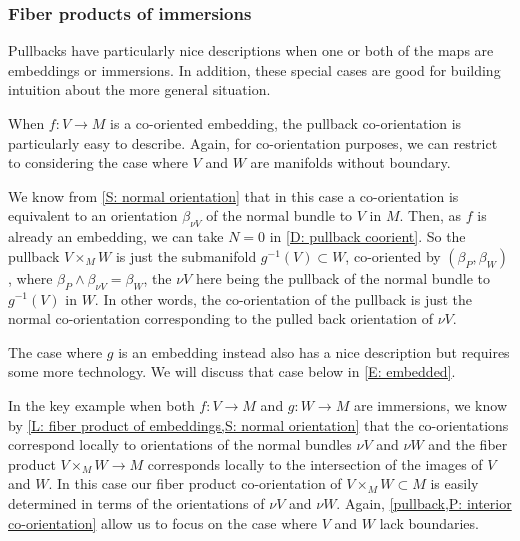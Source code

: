 \subsubsection{Fiber products of immersions}\label{S: co-or product immersion}

Pullbacks have particularly nice descriptions when one or both of the maps are embeddings or immersions.
In addition, these special cases are good for building intuition about the more general situation.

\begin{example}\label{E: V embedded}
	When $f \colon V \to M$ is a co-oriented embedding, the pullback co-orientation is particularly easy to describe. Again, for co-orientation purposes, we can restrict to considering the case where $V$ and $W$ are manifolds without boundary.

	We know from \cref{S: normal orientation} that in this case a co-orientation is equivalent to an orientation $\beta_{\nu V}$ of the normal bundle to $V$ in $M$.
	Then, as $f$ is already an embedding, we can take $N = 0$ in \cref{D: pullback coorient}.
	So the pullback $V \times_M W$ is just the submanifold $g^{-1}(V) \subset W$, co-oriented by $(\beta_P,\beta_W)$, where $\beta_P \wedge \beta_{\nu V} = \beta_W$, the $\nu V$ here being the pullback of the normal bundle to $g^{-1}(V)$ in $W$.
	In other words, the co-orientation of the pullback is just the normal co-orientation corresponding to the pulled back orientation of $\nu V$.

	The case where $g$ is an embedding instead also has a nice description but requires some more technology.
	We will discuss that case below in \cref{E: embedded}.
\end{example}

In the key example when both $f \colon V \to M$ and $g \colon W \to M$ are immersions, we know by \cref{L: fiber product of embeddings,S: normal orientation} that the co-orientations correspond locally to orientations of the normal bundles $\nu V$ and $\nu W$ and the fiber product $V \times_M W \to M$ corresponds locally to the intersection of the images of $V$ and $W$.
In this case our fiber product co-orientation of $V \times_M W \subset M$ is easily determined in terms of the orientations of $\nu V$ and $\nu W$.
Again, \cref{pullback,P: interior co-orientation} allow us to focus on the case where $V$ and $W$ lack boundaries.

